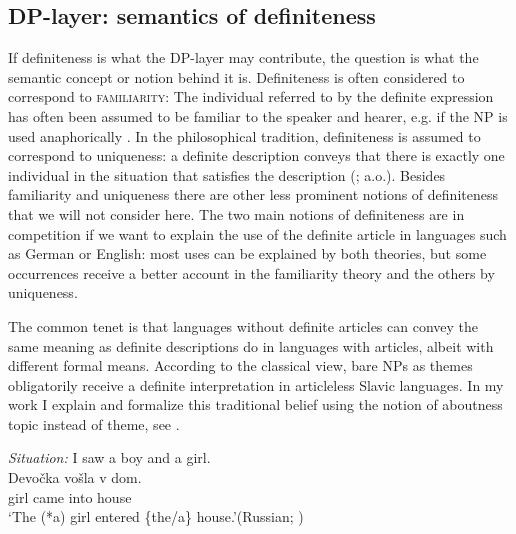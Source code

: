 \documentclass[output=paper,
colorlinks,
citecolor=brown,
newtxmath
]{langscibook}
\begin{document}
\subsection{DP-layer: semantics of definiteness}

If definiteness is what the DP-layer may contribute, the question is what the semantic concept or notion behind it is. Definiteness is often considered to correspond to \textsc{familiarity}:  The individual referred to by the definite expression has often been assumed to be familiar to the speaker and hearer, e.g. if the NP is used anaphorically \citep{Christophersen1939,Heim1982}. In the philosophical tradition, definiteness is assumed to correspond to uniqueness: a definite description conveys that there is exactly one individual in the situation that satisfies the description (\citealt{Chierchia1998,Dayal2004}; a.o.). Besides familiarity and uniqueness there are other less prominent notions of definiteness that we will not consider here. The two main notions of definiteness are in competition if we want to explain the use of the definite article in languages such as German or English: most uses can be explained by both theories, but some occurrences receive a better account in the familiarity theory and the others by uniqueness.

The common tenet is that languages without definite articles can convey the same meaning as definite descriptions do in languages with articles, albeit with different formal means. According to the classical view, bare NPs as themes obligatorily receive a definite interpretation in articleless Slavic languages. In my work \cite{Geist2010} I explain and formalize this traditional belief using the notion of aboutness topic instead of theme, see .


\ea \label{ex:9} \textit{Situation:} I saw a boy and a girl.\\
\gll Devočka	 vošla   	v     dom. \\
    girl  came  	into house\\
\glt `The (*a) girl entered \{the/a\} house.'\hfill (Russian; \citealt[193]{Geist2010})
\z
\end{document}
